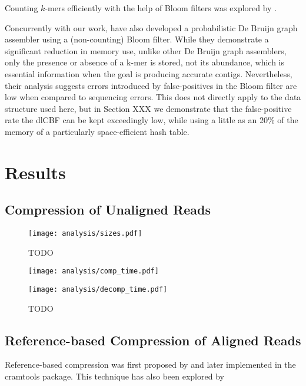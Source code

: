 \documentclass[twocolumn]{article}
\begin{document}
Counting $k$-mers efficiently with the help of Bloom filters was explored by
\citet{Melsted2011}.

Concurrently with our work, \citet{Pell2011} have also developed a
probabilistic De Bruijn graph assembler using a (non-counting) Bloom filter.
While they demonstrate a significant reduction in memory use, unlike other De
Bruijn graph assemblers, only the presence or absence of a k-mer is stored, not
its abundance, which is essential information when the goal is producing
accurate contigs. Nevertheless, their analysis suggests errors introduced by
false-positives in the Bloom filter are low when compared to sequencing
errors. This does not directly apply to the data structure used here, but in
Section XXX we demonstrate that the false-positive rate the dlCBF can be kept
exceedingly low, while using a little as an 20\% of the memory of a
particularly space-efficient hash table.



\section{Results}


\subsection{Compression of Unaligned Reads}

\begin{figure*}
\centerline{\texttt{[image: analysis/sizes.pdf]}}
\caption{TODO}
\label{fig:sizes}
\end{figure*}

\begin{figure*}
\centerline{\texttt{[image: analysis/comp\_time.pdf]}}
\centerline{\texttt{[image: analysis/decomp\_time.pdf]}}
\caption{TODO}
\label{fig:comp_decomp_time}
\end{figure*}

\subsection{Reference-based Compression of Aligned Reads}

Reference-based compression was first proposed by \citet{Hsi-YangFritz2011}
and later implemented in the cramtools package. This technique has also been explored
by 
\end{document}
